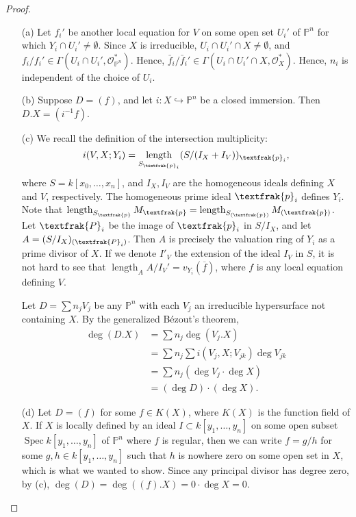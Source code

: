 \documentclass{article}
\newcommand{\goth}[1]{\textfrak{#1}}
\newcommand{\fO}{\mathcal{O}}
\newcommand{\PP}{\mathbb{P}}
\DeclareMathOperator{\len}{length}
\DeclareMathOperator{\spec}{Spec}
\begin{document}
\begin{enumerate} [label=\textbf{\arabic*.}, leftmargin=0em]
\begin{proof} $ $ \vspace{0pt}
\begin{itemize} [leftmargin=0cm]
\item[(a)] Let $f_i'$ be another local equation for $V$ on some open set $U_i'$ of $\PP^n$ for which $Y_i \cap U_i' \neq \emptyset$. Since $X$ is irreducible, $U_i \cap U_i' \cap X \neq \emptyset$, and $f_i / f_i' \in \Gamma(U_i \cap U_i', \fO_{\PP^n}^*)$. Hence, $\bar{f}_i / \bar{f}_i' \in \Gamma(U_i \cap U_i' \cap X, \fO_X^*)$. Hence, $n_i$ is independent of the choice of $U_i$.

\item[(b)] Suppose $D = (f)$, and let $i : X \hookrightarrow \PP^n$ be a closed immersion. Then $D.X = (i^{-1}f)$.

\item[(c)] We recall the definition of the intersection multiplicity:  
\[
    i(V, X; Y_i) = \len_{S_{\goth{p}_i}} (S/(I_X + I_V))_{\goth{p}_i},
\]
where \( S = k[x_0, \dots, x_n] \), and \( I_X, I_V \) are the homogeneous ideals defining \( X \) and \( V \), respectively. The homogeneous prime ideal \( \goth{p}_i \) defines \( Y_i \). Note that $\len_{S_{\goth{p}}} M_\goth{p} = \len_{S_{(\goth{p})}} M_{(\goth{p})}$. Let $\goth{P}_i$ be the image of $\goth{p}_i$ in $S / I_X$, and let $A = (S / I_X)_{(\goth{P}_i)}$. Then $A$ is precisely the valuation ring of $Y_i$ as a prime divisor of $X$. If we denote $I'_V$ the extension of the ideal $I_V$ in $S$, it is not hard to see that $\len_A A / I_V' = v_{Y_i}(\overline{f})$, where $f$ is any local equation defining $V$.

Let $D = \sum n_j V_j$ be any $\PP^n$ with each $V_j$ an irreducible hypersurface not containing $X$. By the generalized Bézout's theorem,
\begin{align*}
    \deg(D.X) & = \sum n_j \deg(V_j.X) \\
    & = \sum n_j \sum i(V_j, X ; V_{jk}) \deg{V_{jk}} \\
    & = \sum n_j (\deg{V_j} \cdot \deg{X}) \\
    & = (\deg{D}) \cdot (\deg{X}).
\end{align*}

\item[(d)] Let $D = (f)$ for some $f \in K(X)$, where $K(X)$ is the function field of $X$. If $X$ is locally defined by an ideal $I \subset k[y_1, \dots, y_n]$ on some open subset $\spec{k[y_1, \dots, y_n]}$ of $\PP^n$ where $f$ is regular, then we can write $f = g / h$ for some $g, h \in k[y_1, \dots, y_n]$ such that $h$ is nowhere zero on some open set in $X$, which is what we wanted to show. Since any principal divisor has degree zero, by (c), $\deg(D) = \deg((f).X) = 0 \cdot \deg{X} = 0$.
\end{itemize}
\end{proof}


\end{enumerate}
\end{document}
